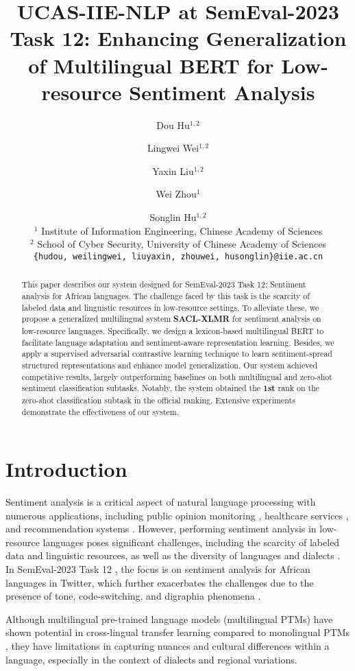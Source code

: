 \documentclass[11pt]{article}
\title{UCAS-IIE-NLP at SemEval-2023 Task 12: Enhancing Generalization of Multilingual BERT for Low-resource Sentiment Analysis}
\author{Dou Hu$^{1,2}$ 
        \and Lingwei Wei$^{1,2}$
        \and Yaxin Liu$^{1,2}$
        \and Wei Zhou$^{1}$
        \and Songlin Hu$^{1,2}$
         \\
        $^{1}$ Institute of Information Engineering, Chinese Academy of Sciences \\
        $^{2}$ School of Cyber Security, University of Chinese Academy of Sciences  \\
        \texttt{\{hudou, weilingwei, liuyaxin, zhouwei, husonglin\}@iie.ac.cn} \\
}
\begin{document}
\maketitle
\begin{abstract}

This paper describes our system designed for SemEval-2023 Task 12: Sentiment analysis for African languages. The challenge faced by this task is the scarcity of labeled data and linguistic resources in low-resource settings. To alleviate these, we propose a generalized multilingual system \textbf{SACL-XLMR} for sentiment analysis on low-resource languages. Specifically, we design a lexicon-based multilingual BERT to facilitate language adaptation and sentiment-aware representation learning. 
Besides, we apply a supervised adversarial contrastive learning technique to learn sentiment-spread structured representations and enhance model generalization. Our system achieved competitive results, largely outperforming baselines on both multilingual and zero-shot sentiment classification subtasks. Notably, the system obtained the \textbf{1st} rank on the zero-shot classification subtask in the official ranking. Extensive experiments demonstrate the effectiveness of our system.

\end{abstract}

\section{Introduction}


Sentiment analysis is a critical aspect of natural language processing with numerous applications, including public opinion monitoring \citep{info:doi/10.2196/21978}, healthcare services \citep{info:doi/10.2196/16023}, and recommendation systems \citep{DBLP:conf/ksem/HuWZHFH21}. However, performing sentiment analysis in low-resource languages poses significant challenges, including the scarcity of labeled data and linguistic resources, as well as the diversity of languages and dialects \citep{DBLP:journals/air/LoCCC17,DBLP:journals/fgcs/OueslatiCHO20}. In SemEval-2023 Task 12 \citep{muhammadSemEval2023}, the focus is on sentiment analysis for African languages in Twitter, which further exacerbates the challenges due to the presence of tone, code-switching, and digraphia phenomena \cite{adebara-abdul-mageed-2022-towards}.

Although multilingual pre-trained language models (multilingual PTMs) \citep{DBLP:conf/nips/ConneauL19,DBLP:conf/acl/ConneauKGCWGGOZ20} have shown potential in cross-lingual transfer learning compared to monolingual PTMs \citep{DBLP:conf/naacl/DevlinCLT19,DBLP:conf/emnlp/0001HDZJMS22}, they have limitations in capturing nuances and cultural differences within a language, especially in the context of dialects and regional variations.
\end{document}
